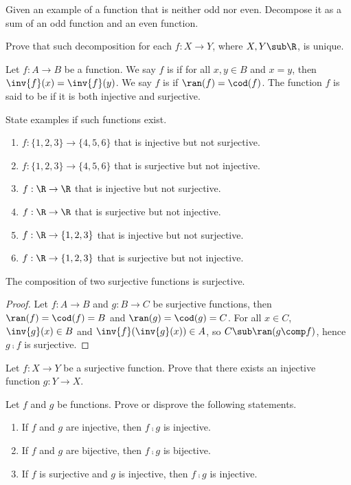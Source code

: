 \documentclass[10pt]{article}
\begin{document}
\begin{problem}
    Given an example of a function that is neither odd nor even. Decompose it as a sum of an odd function and an even function.
\end{problem}
\begin{problem}
    Prove that such decomposition for each $f:X\to Y$, where $X,Y\sub\R$, is unique.
\end{problem}
\begin{definition}
    Let $f:A\to B$ be a function. We say $f$ is  if for all $x,y\in B$ and $x=y$, then $\inv{f}(x)=\inv{f}(y)$. We say $f$ is  if $\ran(f)=\cod(f)$. The function $f$ is said to be  if it is both injective and surjective.
\end{definition}
\begin{problem}
    State examples if such functions exist.
    \begin{enumerate}
        \item $f:\{1,2,3\}\to\{4,5,6\}$ that is injective but not surjective.
        \item $f:\{1,2,3\}\to\{4,5,6\}$ that is surjective but not injective.
        \item $f:\R\to\R$ that is injective but not surjective.
        \item $f:\R\to\R$ that is surjective but not injective.
        \item $f:\R\to\{1,2,3\}$ that is injective but not surjective.
        \item $f:\R\to\{1,2,3\}$ that is surjective but not injective.
    \end{enumerate}
\end{problem}
\begin{proposition}
    The composition of two surjective functions is surjective.
\end{proposition}
\begin{proof}
    Let $f:A\to B$ and $g:B\to C$ be surjective functions, then $\ran(f)=\cod(f)=B$ and $\ran(g)=\cod(g)=C$. For all $x\in C$, $\inv{g}(x)\in B$ and $\inv{f}(\inv{g}(x))\in A$, so $C\sub\ran(g\comp f)$, hence $g\comp f$ is surjective.
\end{proof}
\begin{problem}
    Let $f:X\to Y$ be a surjective function. Prove that there exists an injective function $g:Y\to X$.
\end{problem}
\begin{problem}
    Let $f$ and $g$ be functions. Prove or disprove the following statements.
    \begin{enumerate}
        \item If $f$ and $g$ are injective, then $f\comp g$ is injective. 
        \item If $f$ and $g$ are bijective, then $f\comp g$ is bijective.
        \item If $f$ is surjective and $g$ is injective, then $f\comp g$ is injective.
    \end{enumerate}
\end{problem}
\end{document}
